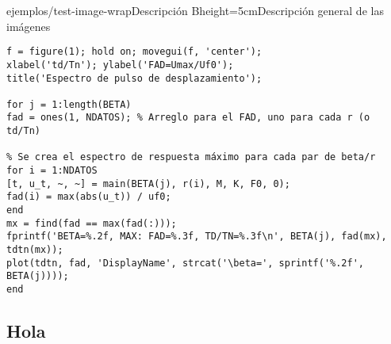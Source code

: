 {ejemplos/test-image-wrap}{Descripción B}{height=5cm}{Descripción general de las imágenes}




\newpage


\begin{lstlisting}[style=Matlab, caption={Ejemplo en Matlab.\label{codigo-matlab}}]
% Se crea gráfico
f = figure(1); hold on; movegui(f, 'center');
xlabel('td/Tn'); ylabel('FAD=Umax/Uf0');
title('Espectro de pulso de desplazamiento');

for j = 1:length(BETA)
fad = ones(1, NDATOS); % Arreglo para el FAD, uno para cada r (o td/Tn)

% Se crea el espectro de respuesta máximo para cada par de beta/r
for i = 1:NDATOS
[t, u_t, ~, ~] = main(BETA(j), r(i), M, K, F0, 0);
fad(i) = max(abs(u_t)) / uf0;
end
mx = find(fad == max(fad(:)));
fprintf('BETA=%.2f, MAX: FAD=%.3f, TD/TN=%.3f\n', BETA(j), fad(mx), tdtn(mx));
plot(tdtn, fad, 'DisplayName', strcat('\beta=', sprintf('%.2f', BETA(j))));
end
\end{lstlisting}

\subsection{Hola}